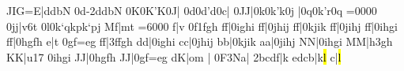  \enotes
\barre\notes{}JIG{=E}|ddbN\enotes
\temps\notes{}\ibu0d{-2}\boqh d\qsk\boqh d\boqh b\boqh N\enotes
\barre\notes{}\ibu0K0\boqh K\qsk\rq K\qh0J|\enotes
\temps\notes{}\ibu0d0\boqh d\qsk\rq d\qh0c|\enotes
\temps\notes\dsoqb0JJ|\ibu0k0\boqh k\rq k\qh0j\enotes
\temps\notes|\ibu0q0\soqh k\qsk\rq r\qh0q\enotes
\cleftoksi={{0}{0}{0}{0}}\zchangeclefs
\barre\noteskipLarge\def\scalenoteskip{1.05}\relax
\notes\dsoqb0jj|\ifx\mxversion\undefined\octsup v6\else\ioctfinup t\fi
 \ibl0l0\soqb k\lq q\soqb k\zq p\soqb k\lq p\soqb j\enotes
\temps\notes\zq M\cu f|\zq m\cl t\zbreath\enotes
\cleftoksi={{6}{0}{0}{0}}\changeclefs
{}\Interligne\def\interfacteur{11}%
\zalapage\notes{}\enotes
\temps\notes\dsoupir\boql f|\ifx\mxversion\undefined\octline v\fi
  \ibl0f1\soqb f\soqb g\soqb h\enotes
\barre\notes{}\boql f\sk\boql f|\qsoqb0ighi\enotes
\temps\notes\boql f\sk\boql f|\qsoqb0jhij\enotes
\barre\notes\boql f\sk\boql f|\qsoqb0kjik\enotes
\temps\notes\boql f\sk\boql f|\qsoqb0jihj\enotes
\barre\notes\boql f\sk\boql f|\qsoqb0ihgi\enotes
\temps\notes\boql f\sk\boql f|\qsoqb0hgfh\enotes
\alaligne\noteskipLarge
\notes{}\sk\boql e|\ifx\mxversion\undefined\octline t\fi
 \qsoqb0gf{=e}g\enotes
\temps\notes\boql f\sk\boql f|\qsoqb3ffgh\enotes
\barre\notes\boql d\sk\boql d|\qsoqb0ighi\enotes
\temps\notes\boql c\sk\boql c|\qsoqb0jhij\enotes
\barre\notes\boql b\sk\boql b|\qsoqb0kjik\enotes
\temps\notes\boql a\sk\boql a|\qsoqb0jihj\enotes
\barre\notes\boql N\sk\boql N|\qsoqb0ihgi\enotes
\temps\notes\boql M\sk\boql M|\soql h\sk\dsoqb3gh\enotes
\alaligne\notes\boql K\sk\boql K|\ifx\mxversion\undefined\octfin u{17}\fi
  \qsoqb0ihgi\enotes
\temps\notes\boql J\sk\boql J|\qsoqb0hgfh\enotes
\barre\notes\boql J\sk\boql J|\qsoqb0gf{=e}g\enotes
\temps\NOtes\pointdorgue d\bohu K|\pointdorgue o\bohl m\relax
  \ifx\mxversion\undefined\else\toctfin\fi \enotes
\barre\notes{}\soupir|\enotes
\temps\notes\Ilegl0F\dqb3Na|\hpause\enotes
\temps\notes\qqb2bcdf|\hu k\enotes
\barre\notes{}edcb|\lh k\hl l\enotes
\temps\notes{}\ql c\sk|\hl l\enotes
